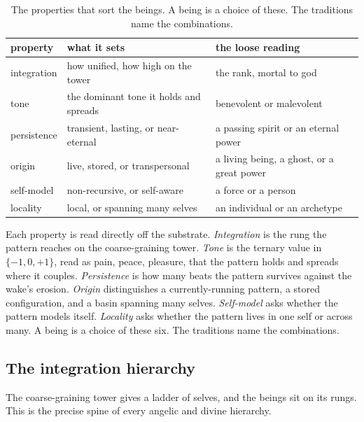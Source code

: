\begin{table}[ht]
\centering
\begin{tabular}{@{}lll@{}}
\toprule
property & what it sets & the loose reading \\
\midrule
integration & how unified, how high on the tower & the rank, mortal to god \\
tone & the dominant tone it holds and spreads & benevolent or malevolent \\
persistence & transient, lasting, or near-eternal & a passing spirit or an eternal power \\
origin & live, stored, or transpersonal & a living being, a ghost, or a great power \\
self-model & non-recursive, or self-aware & a force or a person \\
locality & local, or spanning many selves & an individual or an archetype \\
\bottomrule
\end{tabular}
\caption{The properties that sort the beings. A being is a choice of these. The traditions name the combinations.}
\label{tab:being-properties}
\end{table}

Each property is read directly off the substrate. \emph{Integration} is the rung the pattern reaches on the coarse-graining tower. \emph{Tone} is the ternary value in $\{-1,0,+1\}$, read as pain, peace, pleasure, that the pattern holds and spreads where it couples. \emph{Persistence} is how many beats the pattern survives against the wake's erosion. \emph{Origin} distinguishes a currently-running pattern, a stored configuration, and a basin spanning many selves. \emph{Self-model} asks whether the pattern models itself. \emph{Locality} asks whether the pattern lives in one self or across many. A being is a choice of these six. The traditions name the combinations.

\subsection{The integration hierarchy}

The coarse-graining tower gives a ladder of selves, and the beings sit on its rungs. This is the precise spine of every angelic and divine hierarchy.

